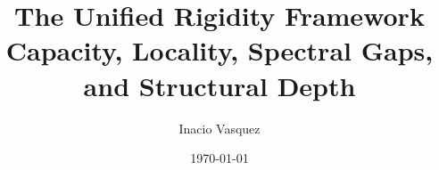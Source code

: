 \documentclass[11pt]{book}
\title{The Unified Rigidity Framework\\ \large Capacity, Locality, Spectral Gaps, and Structural Depth}
\author{Inacio Vasquez}
\date{\today}
\begin{document}
\frontmatter
\maketitle
\tableofcontents

\mainmatter



























\maketitle





\backmatter

\

\nocite{*}

\printindex

\appendix








\end{document}
